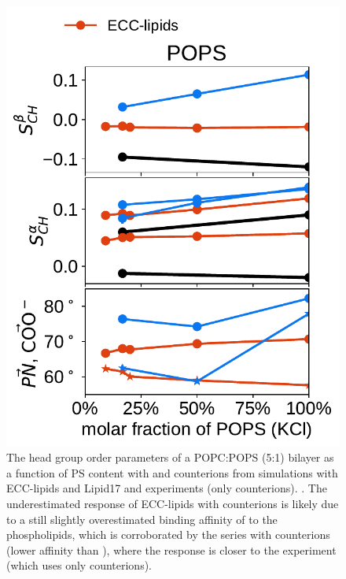 \documentclass[journal=jpcbfk,manuscript=article]{achemso}
\newlength{\figheightsmall}
\newlength{\figheight}
\begin{document}
\begin{figure}[!tbp]
  \includegraphics[height=\figheightsmall]{../Fig/order_parameters_changes_A-B_PC-PS_mix_POPS_kcl.pdf} 
  \caption{\label{fig:delta_ordPar_NaCl_PC-PS_mix} 
    The head group order parameters of a POPC:POPS (5:1) bilayer as a function of PS content
    with  and  counterions from simulations with ECC-lipids and Lipid17 \cite{lipid17-future} 
    and experiments (only  counterions). \cite{roux90}. 
    The underestimated response of ECC-lipids with  counterions 
    is likely due to a still slightly overestimated binding affinity of  to the phospholipids,
    which is corroborated by the series with  counterions (lower affinity than ),
    where the response is closer to the experiment (which uses only  counterions). 
  }
\end{figure} 




 
 
\end{document}
